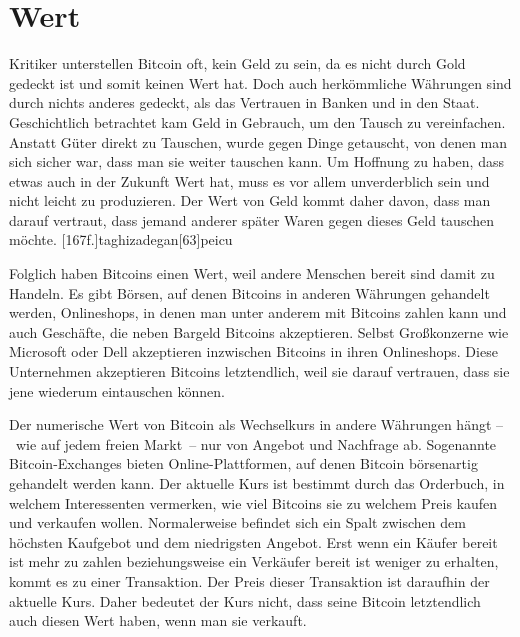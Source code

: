 \section{Wert}

Kritiker unterstellen Bitcoin oft, kein Geld zu sein, da es nicht durch Gold gedeckt ist und somit keinen Wert hat.
Doch auch herkömmliche Währungen sind durch nichts anderes gedeckt, als das Vertrauen in Banken und in den Staat.
Geschichtlich betrachtet kam Geld in Gebrauch, um den Tausch zu vereinfachen.
Anstatt Güter direkt zu Tauschen, wurde gegen Dinge getauscht, von denen man sich sicher war, dass man sie weiter tauschen kann.
Um Hoffnung zu haben, dass etwas auch in der Zukunft Wert hat, muss es vor allem unverderblich sein und nicht leicht zu produzieren.
Der Wert von Geld kommt daher davon, dass man darauf vertraut, dass jemand anderer später Waren gegen dieses Geld tauschen möchte.
[167f.]{taghizadegan}[63]{peicu}

Folglich haben Bitcoins einen Wert, weil andere Menschen bereit sind damit zu Handeln.
Es gibt Börsen, auf denen Bitcoins in anderen Währungen gehandelt werden, Onlineshops, in denen man unter anderem mit Bitcoins zahlen kann und auch Geschäfte, die neben Bargeld Bitcoins akzeptieren.
Selbst Großkonzerne wie Microsoft oder Dell akzeptieren inzwischen Bitcoins in ihren Onlineshops.
Diese Unternehmen akzeptieren Bitcoins letztendlich, weil sie darauf vertrauen, dass sie jene wiederum eintauschen können.

Der numerische Wert von Bitcoin als Wechselkurs in andere Währungen hängt --~wie auf jedem freien Markt~-- nur von Angebot und Nachfrage ab.
Sogenannte Bitcoin-Exchanges bieten Online-Plattformen, auf denen Bitcoin börsenartig gehandelt werden kann.
Der aktuelle Kurs ist bestimmt durch das Orderbuch, in welchem Interessenten vermerken, wie viel Bitcoins sie zu welchem Preis kaufen und verkaufen wollen.
Normalerweise befindet sich ein Spalt zwischen dem höchsten Kaufgebot und dem niedrigsten Angebot.
Erst wenn ein Käufer bereit ist mehr zu zahlen beziehungsweise ein Verkäufer bereit ist weniger zu erhalten, kommt es zu einer Transaktion.
Der Preis dieser Transaktion ist daraufhin der aktuelle Kurs.
Daher bedeutet der Kurs nicht, dass seine Bitcoin letztendlich auch diesen Wert haben, wenn man sie verkauft.
